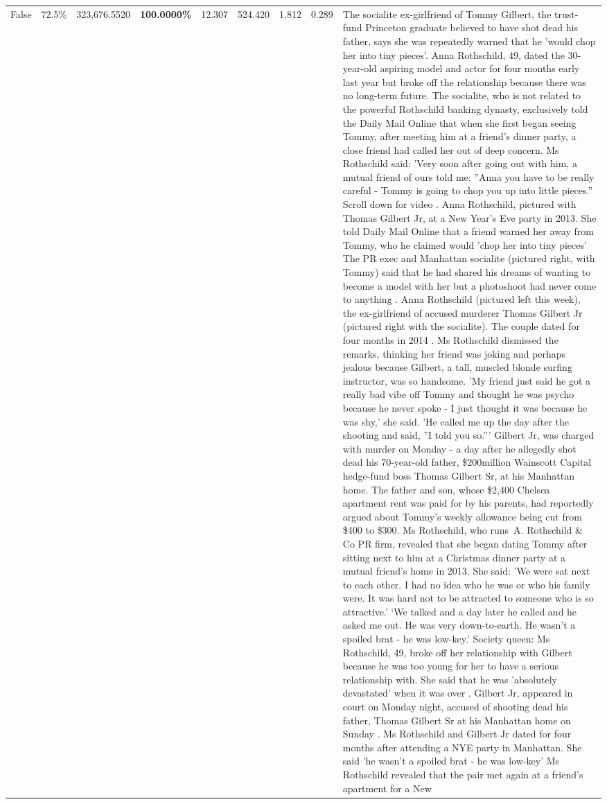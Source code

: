 \begin{table}[H]
\begin{tabular}{lllrlllll}
False & 72.5\% & 323,676.5520 & \bfseries \color{red} 100.0000\% & 12.307 & 524.420 & 1,812 & 0.289 & The socialite ex-girlfriend of Tommy Gilbert, the trust-fund Princeton graduate believed to have shot dead his father, says she was repeatedly warned that he 'would chop her into tiny pieces'. Anna Rothschild, 49, dated the 30-year-old aspiring model and actor for four months early last year but broke off the relationship because there was no long-term future. The socialite, who is not related to the powerful Rothschild banking dynasty, exclusively told the Daily Mail Online that when she first began seeing Tommy, after meeting him at a friend's dinner party, a close friend had called her out of deep concern. Ms Rothschild said: 'Very soon after going out with him, a mutual friend of ours told me: ''Anna you have to be really careful - Tommy is going to chop you up into little pieces.'' Scroll down for video . Anna Rothschild, pictured with Thomas Gilbert Jr, at a New Year's Eve party in 2013. She told Daily Mail Online that a friend warned her away from Tommy, who he claimed would 'chop her into tiny pieces' The PR exec and Manhattan socialite (pictured right, with Tommy) said that he had shared his dreams of wanting to become a model with her but a photoshoot had never come to anything . Anna Rothschild (pictured left this week), the ex-girlfriend of accused murderer Thomas Gilbert Jr (pictured right with the socialite). The couple dated for four months in 2014 . Ms Rothschild dismissed the remarks, thinking her friend was joking and perhaps jealous because Gilbert, a tall, muscled blonde surfing instructor, was so handsome. 'My friend just said he got a really bad vibe off Tommy and thought he was psycho because he never spoke - I just thought it was because he was shy,' she said. 'He called me up the day after the shooting and said, ''I told you so.''' Gilbert Jr, was charged with murder on Monday - a day after he allegedly shot dead his 70-year-old father, \$200million Wainscott Capital hedge-fund boss Thomas Gilbert Sr, at his Manhattan home. The father and son, whose \$2,400 Chelsea apartment rent was paid for by his parents, had reportedly argued about Tommy's weekly allowance being cut from \$400 to \$300. Ms Rothschild, who runs A. Rothschild \& Co PR firm, revealed that she began dating Tommy after sitting next to him at a Christmas dinner party at a mutual friend's home in 2013. She said: 'We were sat next to each other. I had no idea who he was or who his family were. It was hard not to be attracted to someone who is so attractive.' ‘We talked and a day later he called and he asked me out. He was very down-to-earth. He wasn’t a spoiled brat - he was low-key.’ Society queen: Ms Rothschild, 49, broke off her relationship with Gilbert because he was too young for her to have a serious relationship with. She said that he was 'absolutely devastated' when it was over . Gilbert Jr, appeared in court on Monday night, accused of shooting dead his father, Thomas Gilbert Sr at his Manhattan home on Sunday . Ms Rothschild and Gilbert Jr dated for four months after attending a NYE party in Manhattan. She said 'he wasn't a spoiled brat - he was low-key' Ms Rothschild revealed that the pair met again at a friend’s apartment for a New 
\end{tabular}
\end{table}
